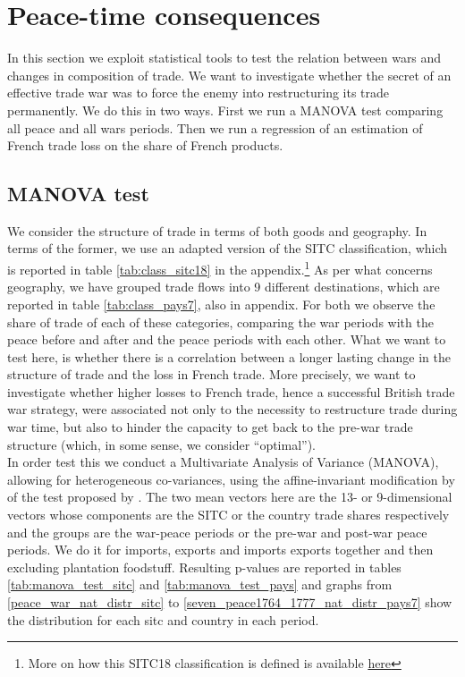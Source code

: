 \documentclass[12pt,a4paper,notitlepage,english]{article}
\begin{document}
\section{Peace-time consequences} \label{sec:empirical_analysis}
In this section we exploit statistical tools to test the relation between wars and changes in composition of trade. We want to investigate whether the secret of an effective trade war was to force the enemy into restructuring its trade permanently. We do this in two ways. First we run a MANOVA test comparing all peace and all wars periods. Then we run a regression of an estimation of French trade loss on the share of French products.

\subsection{MANOVA test}
We consider the structure of trade in terms of both goods and geography. 
In terms of the former, we use an adapted version of the SITC classification, which is reported in table \ref{tab:class_sitc18} in the appendix.\footnote{More on how this SITC18 classification is defined is available \href{http://toflit18.medialab.sciences-po.fr/\#/home}{here}} As per what concerns geography, we have grouped trade flows into 9 different destinations, which are reported in table \ref{tab:class_pays7}, also in appendix. For both we observe the share of trade of each of these categories, comparing the war periods with the peace before and after and the peace periods with each other. 
What we want to test here, is whether there is a correlation between a longer lasting change in the structure of trade and the loss in French trade. More precisely, we want to investigate whether higher losses to French trade, hence a successful British trade war strategy, were associated not only to the necessity to restructure trade during war time, but also to hinder the capacity to get back to the pre-war trade structure (which, in some sense, we consider ``optimal''). \\
In order test this we conduct a Multivariate Analysis of Variance (MANOVA), allowing for heterogeneous co-variances, using the affine-invariant modification by \cite{Krishnamoorthy2004} of the test proposed by \cite{Nel1986}. The two mean vectors here are the 13- or 9-dimensional vectors whose components are the SITC or the country trade shares respectively and the groups are the war-peace periods or the pre-war and post-war peace periods. 
We do it for imports, exports and imports exports together and then excluding plantation foodstuff. Resulting p-values are reported in tables \ref{tab:manova_test_sitc} and \ref{tab:manova_test_pays} and graphs from \ref{peace_war_nat_distr_sitc} to \ref{seven_peace1764_1777_nat_distr_pays7} show the distribution for each sitc and country in each period. \\
\end{document}
